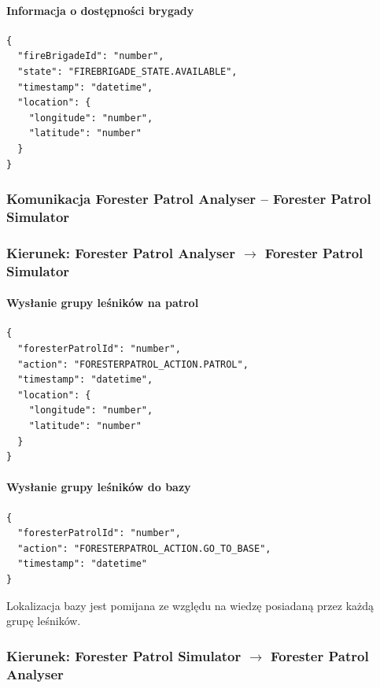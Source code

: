 \paragraph{Informacja o dostępności brygady}

\begin{verbatim}
{
  "fireBrigadeId": "number",
  "state": "FIREBRIGADE_STATE.AVAILABLE",
  "timestamp": "datetime",
  "location": {
    "longitude": "number",
    "latitude": "number"
  }
}
\end{verbatim}

\subsubsection{Komunikacja Forester Patrol Analyser -- Forester Patrol Simulator}

\subsubsection*{Kierunek: Forester Patrol Analyser $\rightarrow$ Forester Patrol Simulator}

\paragraph{Wysłanie grupy leśników na patrol}

\begin{verbatim}
{
  "foresterPatrolId": "number",
  "action": "FORESTERPATROL_ACTION.PATROL",
  "timestamp": "datetime",
  "location": {
    "longitude": "number",
    "latitude": "number"
  }
}
\end{verbatim}

\paragraph{Wysłanie grupy leśników do bazy}

\begin{verbatim}
{
  "foresterPatrolId": "number",
  "action": "FORESTERPATROL_ACTION.GO_TO_BASE",
  "timestamp": "datetime"
}
\end{verbatim}

Lokalizacja bazy jest pomijana ze względu na wiedzę posiadaną przez każdą grupę leśników.

\subsubsection*{Kierunek: Forester Patrol Simulator $\rightarrow$ Forester Patrol Analyser}

